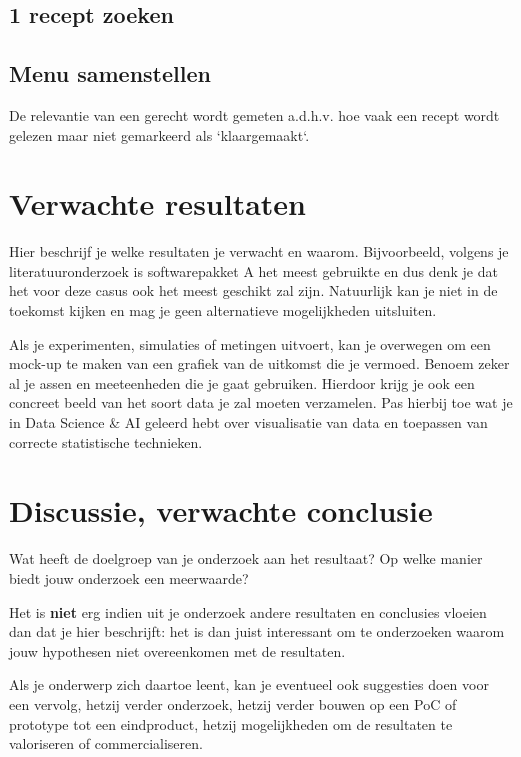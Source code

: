 \documentclass{hogent-article}
\begin{document}
 \subsection{1 recept zoeken}%
\subsection{Menu samenstellen}%

De relevantie van een gerecht wordt gemeten a.d.h.v. hoe vaak een recept wordt gelezen maar niet gemarkeerd als `klaargemaakt`.


\section{Verwachte resultaten}%
\label{sec:verwachte-resultaten}


Hier beschrijf je welke resultaten je verwacht en waarom. Bijvoorbeeld, volgens je literatuuronderzoek is softwarepakket A het meest gebruikte en dus denk je dat het voor deze casus ook het meest geschikt zal zijn. Natuurlijk kan je niet in de toekomst kijken en mag je geen alternatieve mogelijkheden uitsluiten.

Als je experimenten, simulaties of metingen uitvoert, kan je overwegen om een mock-up te maken van een grafiek van de uitkomst die je vermoed. Benoem zeker al je assen en meeteenheden die je gaat gebruiken. Hierdoor krijg je ook een concreet beeld van het soort data je zal moeten verzamelen. Pas hierbij toe wat je in Data Science \& AI geleerd hebt over visualisatie van data en toepassen van correcte statistische technieken.

\section{Discussie, verwachte conclusie}%
\label{sec:discussie-conclusie}

Wat heeft de doelgroep van je onderzoek aan het resultaat? Op welke manier biedt jouw onderzoek een meerwaarde?

Het is \textbf{niet} erg indien uit je onderzoek andere resultaten en conclusies vloeien dan dat je hier beschrijft: het is dan juist interessant om te onderzoeken waarom jouw hypothesen niet overeenkomen met de resultaten.

Als je onderwerp zich daartoe leent, kan je eventueel ook suggesties doen voor een vervolg, hetzij verder onderzoek, hetzij verder bouwen op een PoC of prototype tot een eindproduct, hetzij mogelijkheden om de resultaten te valoriseren of commercialiseren.


\end{document}
